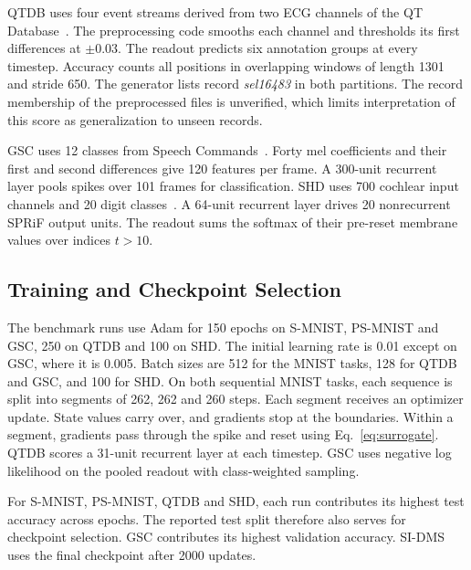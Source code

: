 \documentclass[letterpaper,journal]{IEEEtran}
\begin{document}
QTDB uses four event streams derived from two ECG channels of the QT Database~\cite{laguna1997database}. The preprocessing code smooths each channel and thresholds its first differences at $\pm0.03$. The readout predicts six annotation groups at every timestep. Accuracy counts all positions in overlapping windows of length 1301 and stride 650. The generator lists record \emph{sel16483} in both partitions. The record membership of the preprocessed files is unverified, which limits interpretation of this score as generalization to unseen records.

GSC uses 12 classes from Speech Commands~\cite{warden2018speech}. Forty mel coefficients and their first and second differences give 120 features per frame. A 300-unit recurrent layer pools spikes over 101 frames for classification. SHD uses 700 cochlear input channels and 20 digit classes~\cite{cramer2022heidelberg}. A 64-unit recurrent layer drives 20 nonrecurrent SPRiF output units. The readout sums the softmax of their pre-reset membrane values over indices $t>10$.

\subsection{Training and Checkpoint Selection}
\label{sec:training}

The benchmark runs use Adam for 150 epochs on S-MNIST, PS-MNIST and GSC, 250 on QTDB and 100 on SHD. The initial learning rate is 0.01 except on GSC, where it is 0.005. Batch sizes are 512 for the MNIST tasks, 128 for QTDB and GSC, and 100 for SHD. On both sequential MNIST tasks, each sequence is split into segments of 262, 262 and 260 steps. Each segment receives an optimizer update. State values carry over, and gradients stop at the boundaries. Within a segment, gradients pass through the spike and reset using Eq.~\eqref{eq:surrogate}. QTDB scores a 31-unit recurrent layer at each timestep. GSC uses negative log likelihood on the pooled readout with class-weighted sampling.

For S-MNIST, PS-MNIST, QTDB and SHD, each run contributes its highest test accuracy across epochs. The reported test split therefore also serves for checkpoint selection. GSC contributes its highest validation accuracy. SI-DMS uses the final checkpoint after 2000 updates.
\end{document}

